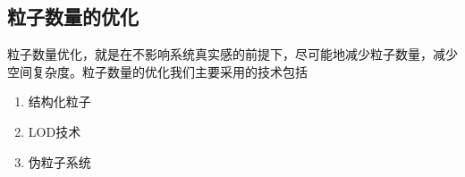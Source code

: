 \documentclass[UTF8,a4paper,14pt]{ctexart}
\begin{document}
	\subsection{粒子数量的优化}
		粒子数量优化，就是在不影响系统真实感的前提下，尽可能地减少粒子数量，减少空间复杂度。粒子数量的优化我们主要采用的技术包括
			\begin{enumerate}[fullwidth, itemindent= 2em]
				\item 结构化粒子
				\item LOD技术
				\item 伪粒子系统
			\end{enumerate}
\end{document}
